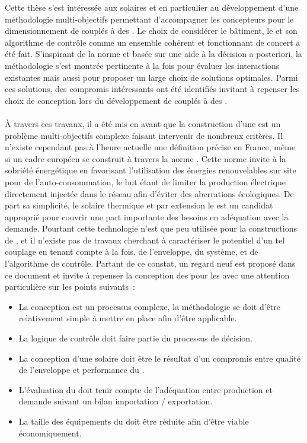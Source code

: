 

Cette thèse s’est intéressée aux  solaires et en particulier au développement
d’une méthodologie  multi-objectifs permettant d’accompagner les concepteurs pour le
dimensionnement de  couplés à des . Le choix de
considérer le bâtiment, le  et son algorithme de contrôle comme un ensemble
cohérent et fonctionnant de concert a été fait. S’inspirant de la norme  et
basée sur une aide à la décision a posteriori, la méthodologie s’est montrée pertinente
à la fois pour évaluer les interactions existantes mais aussi pour proposer un large choix
de solutions optimales. Parmi ces solutions, des compromis intéressants ont été
identifiés invitant à repenser les choix de conception lors du développement de 
couplés à des .


\paragraph{} %
À travers ces travaux, il a été mis en avant que la construction d’une  est un
problème multi-objectifs complexe faisant intervenir de nombreux critères. Il n’existe
cependant pas à l’heure actuelle une définition précise en France, même si un cadre
européen se construit à travers la norme . Cette norme invite à
la sobriété énergétique en favorisant l’utilisation des énergies renouvelables sur site
pour de l’auto-consommation, le but étant de limiter la production électrique directement
injectée dans le réseau afin d’éviter des aberrations écologiques.
De part sa simplicité, le solaire thermique et par extension le  est un
candidat approprié pour couvrir une part importante des besoins en adéquation avec la
demande. Pourtant cette technologie n’est que peu utilisée pour la constructions de
, et il n’existe pas de travaux cherchant à caractériser le potentiel d’un tel
couplage en tenant compte à la fois, de l’enveloppe, du système, et de l’algorithme de
contrôle. Partant de ce constat, un regard neuf est proposé dans ce document et invite à
repenser la conception des  pour les  avec une attention
particulière sur les points suivants~:
\begin{itemize}
    \item La conception est un processus complexe, la méthodologie se doit d’être
          relativement simple à mettre en place afin d’être applicable.
    \item La logique de contrôle doit faire partie du processus de décision.
    \item La conception d’une  solaire doit être le résultat d’un compromis
          entre qualité de l’enveloppe et performance du .
    \item L’évaluation du  doit tenir compte de l’adéquation entre production
          et demande suivant un bilan importation / exportation.
    \item La taille des équipements du  doit être réduite afin d’être viable
          économiquement.
\end{itemize}

